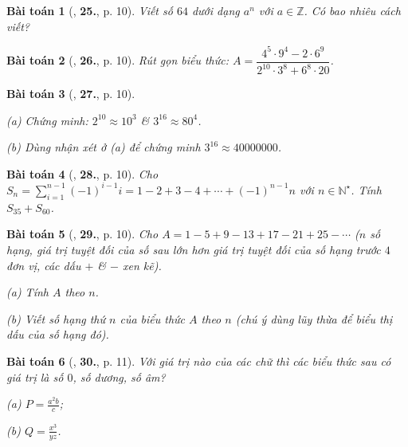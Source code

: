 \documentclass{article}
\numberwithin{equation}{section}
\newtheorem{baitoan}{Bài toán}[section]
\begin{document}
\begin{baitoan}[\cite{Binh_Toan_7_tap_1}, \textbf{25.}, p. 10]
	Viết số $64$ dưới dạng $a^n$ với $a\in\mathbb{Z}$. Có bao nhiêu cách viết?
\end{baitoan}

\begin{baitoan}[\cite{Binh_Toan_7_tap_1}, \textbf{26.}, p. 10]
	Rút gọn biểu thức: $A = \dfrac{4^5\cdot 9^4 - 2\cdot 6^9}{2^{10}\cdot 3^8 + 6^8\cdot 20}$.
\end{baitoan}

\begin{baitoan}[\cite{Binh_Toan_7_tap_1}, \textbf{27.}, p. 10]
	\begin{enumerate*}
		\item[(a)] Chứng minh: $2^{10}\approx 10^3$ \& $3^{16}\approx 80^4$.
		\item[(b)] Dùng nhận xét ở (a) để chứng minh $3^{16}\approx 40000000$.
	\end{enumerate*}
\end{baitoan}

\begin{baitoan}[\cite{Binh_Toan_7_tap_1}, \textbf{28.}, p. 10]
	Cho $S_n = \sum_{i=1}^{n-1} (-1)^{i-1}i = 1 - 2 + 3 - 4 + \cdots + (-1)^{n-1}n$ với $n\in\mathbb{N}^\star$. Tính $S_{35} + S_{60}$.
\end{baitoan}

\begin{baitoan}[\cite{Binh_Toan_7_tap_1}, \textbf{29.}, p. 10]
	Cho $A = 1 - 5 + 9 - 13 + 17 - 21 + 25 - \cdots$ ($n$ số hạng, giá trị tuyệt đối của số sau lớn hơn giá trị tuyệt đối của số hạng trước $4$ đơn vị, các dấu $+$ \& $-$ xen kẽ).
	\begin{enumerate*}
		\item[(a)] Tính $A$ theo $n$.
		\item[(b)] Viết số hạng thứ $n$ của biểu thức $A$ theo $n$ (chú ý dùng lũy thừa để biểu thị dấu của số hạng đó).
	\end{enumerate*}
\end{baitoan}

\begin{baitoan}[\cite{Binh_Toan_7_tap_1}, \textbf{30.}, p. 11]
	Với giá trị nào của các chữ thì các biểu thức sau có giá trị là số $0$, số dương, số âm?
	\begin{enumerate*}
		\item[(a)] $P = \frac{a^2b}{c}$;
		\item[(b)] $Q = \frac{x^3}{yz}$.
	\end{enumerate*}
\end{baitoan}
\end{document}
